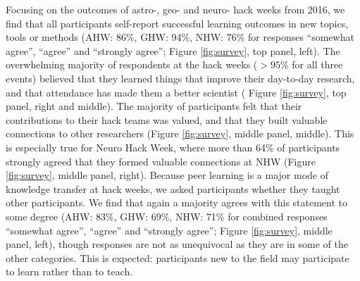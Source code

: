 Focusing on the outcomes of astro-, geo- and neuro- hack weeks from 2016, we find that all participants self-report successful learning outcomes in new topics, tools or methods (AHW: 86\%, GHW: 94\%, NHW: 76\% for responses ``somewhat agree'', ``agree'' and ``strongly agree''; Figure \ref{fig:survey}, top panel, left).
The overwhelming majority of respondents at the hack weeks ($>95\%$ for all three events) believed that they learned things that improve their day-to-day research, and that attendance has made them a better scientist ( Figure \ref{fig:survey}, top panel, right and middle).
The majority of participants felt that their contributions to their hack teams was valued, and that they built valuable connections to other researchers (Figure \ref{fig:survey}, middle panel, middle).
This is especially true for Neuro Hack Week, where more than 64\% of participants strongly agreed that they formed valuable connections at NHW (Figure  \ref{fig:survey}, middle panel, right).
Because peer learning is a major mode of knowledge transfer at hack weeks, we asked participants whether they taught other participants.
We find that again a majority agrees with this statement to some degree (AHW: 83\%, GHW: 69\%, NHW: 71\% for combined responses ``somewhat agree'', ``agree'' and ``strongly agree''; Figure \ref{fig:survey}, middle panel, left), though responses are not as unequivocal as they are in some of the other categories.
This is expected: participants new to the field may participate to learn rather than to teach.

